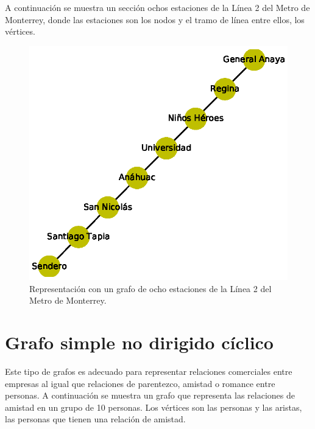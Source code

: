 \documentclass{article}
\begin{document}
A continuación se muestra un sección ochos estaciones de la Línea 2 del Metro de Monterrey, donde las estaciones son los nodos y el tramo de línea entre ellos, los vértices. 



\begin{figure}
  \includegraphics[width=.8\columnwidth]{1.eps}
  \caption{Representación con un grafo de ocho estaciones de la Línea 2 del Metro de Monterrey.}
  \label{fig:1}
\end{figure}

\section{Grafo simple no dirigido cíclico}

Este tipo de grafos es adecuado para representar relaciones comerciales entre empresas al igual que relaciones de parentezco, amistad o romance entre personas.
 A continuación se muestra un grafo que representa las relaciones de amistad en un grupo de 10 personas. Los vértices son las personas y las aristas, las personas que tienen una relación de amistad.
 

\end{document}

